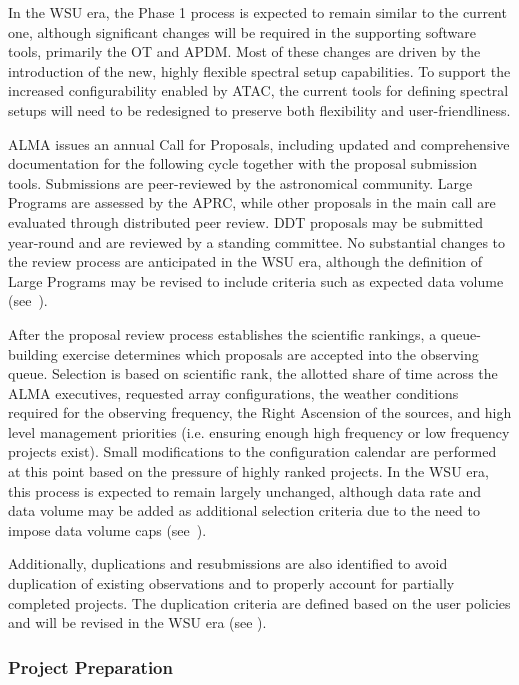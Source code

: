 In the WSU era, the Phase 1 process is expected to remain similar to the current one, although significant changes will be required in the supporting software tools, primarily the \ac{OT} and \ac{APDM}. Most of these changes are driven by the introduction of the new, highly flexible spectral setup capabilities. To support the increased configurability enabled by \ac{ATAC}, the current tools for defining spectral setups will need to be redesigned to preserve both flexibility and user-friendliness.

ALMA issues an annual Call for Proposals, including updated and comprehensive documentation for the following cycle together with the proposal submission tools. Submissions are peer-reviewed by the astronomical community. Large Programs are assessed by the \ac{APRC}, while other  proposals in the main call are evaluated through distributed peer review. \ac{DDT} proposals may be submitted year-round and are reviewed by a standing committee. No substantial changes to the review process are anticipated in the WSU era, although the definition of Large Programs may be revised to include criteria such as expected data volume (see~\cite{TWO}). 

After the proposal review process establishes the scientific rankings, a queue-building exercise determines which proposals are accepted into the observing queue. 
Selection is based on scientific rank, the allotted share of time across the ALMA executives, requested array configurations, the weather conditions required for the observing frequency, the Right Ascension of the sources, and high level management priorities (i.e. ensuring enough high frequency or low frequency projects exist). Small modifications to the configuration calendar are performed at this point based on the pressure of highly ranked projects. 
In the WSU era, this process is expected to remain largely unchanged, although data rate and data volume may be added as additional selection criteria due to the need to impose data volume caps (see~\cite{TWO}).

Additionally, duplications and resubmissions are also identified to avoid duplication of existing observations and to properly account for partially completed projects. The duplication criteria are defined based on the user policies and will be revised in the WSU era (see \cite{TWO}). 


\subsubsection{Project Preparation}

